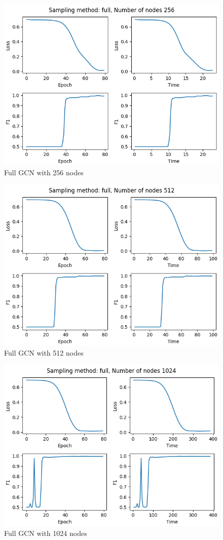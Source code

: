 \begin{figure}[H]
    \centering
    \includegraphics[scale=0.8, ]{assets/plots/full_256.png}
    \caption{Full GCN with 256 nodes}
\end{figure}

\begin{figure}[H]
    \centering
    \includegraphics[scale=0.8, ]{assets/plots/full_512.png}
    \caption{Full GCN with 512 nodes}
\end{figure}

\begin{figure}[H]
    \centering
    \includegraphics[scale=0.8, ]{assets/plots/full_1024.png}
    \caption{Full GCN with 1024 nodes}
\end{figure}